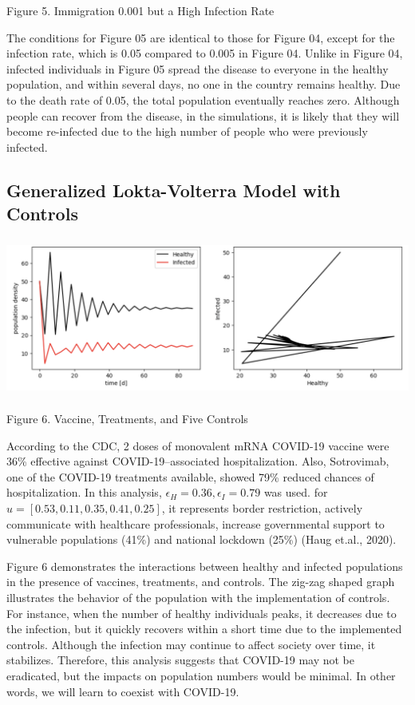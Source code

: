 \vspace{3mm}
\hspace{30mm} Figure 5. Immigration 0.001 but a High Infection Rate

\vspace{3mm}

The conditions for Figure 05 are identical to those for Figure 04, except for the infection rate, which is 0.05 compared to 0.005 in Figure 04. Unlike in Figure 04, infected individuals in Figure 05 spread the disease to everyone in the healthy population, and within several days, no one in the country remains healthy. Due to the death rate of 0.05, the total population eventually reaches zero. Although people can recover from the disease, in the simulations, it is likely that they will become re-infected due to the high number of people who were previously infected.

\subsection{Generalized Lokta-Volterra Model with Controls}

\includegraphics[width=16cm, height=5.2cm]{img/with_control.png}

\vspace{3mm}
\hspace{30mm} Figure 6. Vaccine, Treatments, and Five Controls

\vspace{3mm}

According to the CDC, 2 doses of monovalent mRNA COVID-19 vaccine were 36\% effective against COVID-19–associated hospitalization. Also, Sotrovimab, one of the COVID-19 treatments available, showed 79\% reduced chances of hospitalization. In this analysis, $\epsilon_H = 0.36, \epsilon_I = 0.79$ was used. for $u = [0.53, 0.11, 0.35, 0.41, 0.25]$, it represents border restriction, actively communicate with healthcare professionals, increase governmental support to vulnerable populations (41\%) and national lockdown (25\%) (Haug et.al., 2020).


Figure 6 demonstrates the interactions between healthy and infected populations in the presence of vaccines, treatments, and controls. The zig-zag shaped graph illustrates the behavior of the population with the implementation of controls. For instance, when the number of healthy individuals peaks, it decreases due to the infection, but it quickly recovers within a short time due to the implemented controls. Although the infection may continue to affect society over time, it stabilizes. Therefore, this analysis suggests that COVID-19 may not be eradicated, but the impacts on population numbers would be minimal. In other words, we will learn to coexist with COVID-19.